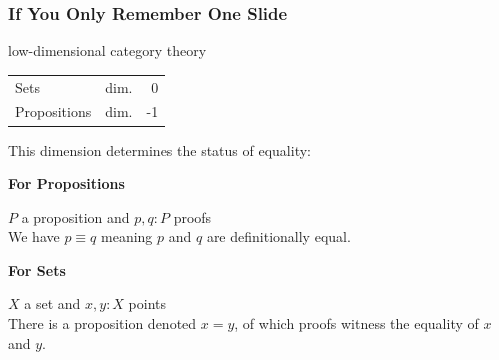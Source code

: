 \begin{frame}
  \frametitle{If You Only Remember One Slide}

  \pause
  low-dimensional category theory
  \begin{tightcenter}
    \begin{tabular}{ll@{}r}
      Sets         & dim. &  0 \\
      Propositions & dim. & -1
    \end{tabular}
  \end{tightcenter}

  This dimension determines the status of equality:
  
  \begin{minipage}[t]{0.4\textwidth}
    \begin{tightcenter}
    \textbf{For Propositions}
    \end{tightcenter}

    $P$ a proposition and $p,q:P$ proofs \\
    We have $p≡q$ meaning $p$ and $q$ are definitionally equal.
  \end{minipage}
  \hspace{0.09\textwidth}
  \begin{minipage}[t]{0.4\textwidth}
    \begin{tightcenter}
    \textbf{For Sets}
    \end{tightcenter}

    $X$ a set and $x,y:X$ points \\
    There is a proposition denoted $x=y$, of which proofs witness the equality
    of $x$ and $y$.
  \end{minipage}
\end{frame}

